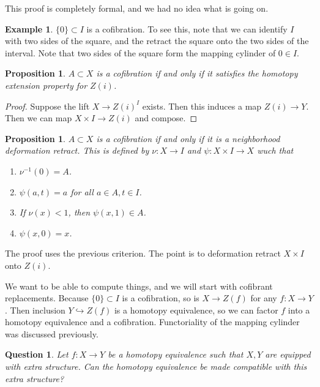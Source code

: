 \documentclass[leqno, openany]{memoir}
\newtheorem{prop}[thm]{Proposition}
\newtheorem{quest}[thm]{Question}
\theoremstyle{definition}
\newtheorem{exm}[thm]{Example}
\theoremstyle{remark}
\theoremstyle{plain}
\theoremstyle{definition}
\theoremstyle{remark}
\begin{document}
This proof is completely formal, and we had no idea what is going on.

\begin{exm}
    $ \{ 0 \} \subset I$ is a cofibration. To see this, note that we can identify $I$ with two sides of the square, and the retract the square onto the two sides of the interval. Note that two sides of the square form the mapping cylinder of $0 \in I$.
\end{exm}

\begin{prop}
    $A \subset X$ is a cofibration if and only if it satisfies the homotopy extension property for $Z(i)$.
\end{prop}

\begin{proof}
    Suppose the lift $X \to Z(i)^I$ exists. Then this induces a map $Z(i) \to Y$. Then we can map $X \times I \to Z(i)$ and compose.
\end{proof}

\begin{prop}
    $A \subset X$ is a cofibration if and only if it is a neighborhood deformation retract. This is defined by $\nu \colon X \to I$ and $\psi \colon X \times I \to X$ wuch that
    \begin{enumerate}
        \item $\nu^{-1}(0) = A$.
        \item $\psi(a,t) = a$ for all $a \in A, t \in I$.
        \item If $\nu(x) < 1$, then $\psi(x,1) \in A$.
        \item $\psi(x,0) = x$.
    \end{enumerate}
\end{prop}

The proof uses the previous criterion. The point is to deformation retract $X \times I$ onto $Z(i)$.

We want to be able to compute things, and we will start with cofibrant replacements. Because $\{ 0 \} \subset I$ is a cofibration, so is $X \to Z(f)$ for any $f \colon X \to Y$. Then inclusion $Y \hookrightarrow Z(f)$ is a homotopy equivalence, so we can factor $f$ into a homotopy equivalence and a cofibration. Functoriality of the mapping cylinder was discussed previously.

\begin{quest}
    Let $f \colon X \to Y$ be a homotopy equivalence such that $X,Y$ are equipped with extra structure. Can the homotopy equivalence be made compatible with this extra structure?
\end{quest}
\end{document}
